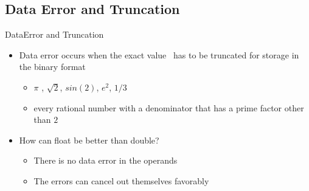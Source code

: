 \documentclass[10pt]{beamer}
\begin{document}
\subsection{Data Error and Truncation}
\begin{frame}{DataError and Truncation}
\begin{itemize}
\item Data error occurs when the \color{red} exact value~\color{black} has to be \color{red} truncated \color{black} for storage in the binary format
	\begin{itemize}
		\item $\pi$ , $\sqrt{2}$, $sin(2)$, $e^2$, $1/3$
		\item every rational number with a denominator that has a prime 
		      factor other than $2$
	\end{itemize}
\item How can float be better than double?
\begin{itemize}
	\item There is \color{red} no data error \color{black} in the operands
	\item The errors can \color{red} cancel out \color{black} themselves 
		  favorably
\end{itemize}
\color{black}
\end{itemize}

\end{frame}
\end{document}

